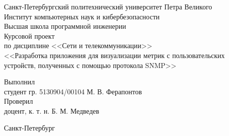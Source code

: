 \begin{titlepage}

	\begin{center}
	  Санкт-Петербургский политехнический университет Петра Великого\\
	  Институт компьютерных наук и кибербезопасности\\
	  Высшая школа программной инженерии\\[8cm]

	  {\LARGE Курсовой проект}\\[0.5cm]
	  \noindent по дисциплине <<Сети и телекоммуникации>>\\
	  \noindent <<Разработка приложения для визуализации метрик с пользовательских устройств, полученных с помощью протокола SNMP>>
	  \\[5cm]
	\end{center}

	  \noindent Выполнил\\
	  \noindent студент гр. 5130904/00104 \hfill М. В. Ферапонтов\\

	  \noindent Проверил \\
	  \noindent доцент, к. т. н. \hfill Б. М. Медведев

	\vfill

	\begin{center}
	  Санкт-Петербург\\
	  \the\year
	\end{center}

\end{titlepage}
